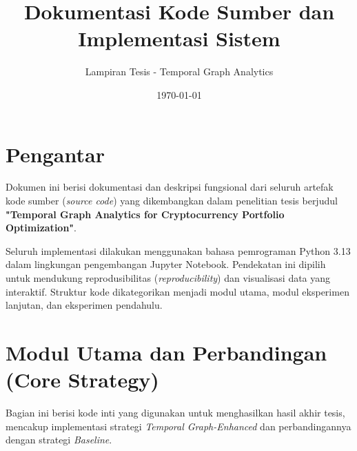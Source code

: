 \documentclass[a4paper,12pt]{article}
\title{\textbf{Dokumentasi Kode Sumber dan Implementasi Sistem}}
\author{Lampiran Tesis - Temporal Graph Analytics}
\date{\today}
\begin{document}
\maketitle

\section*{Pengantar}
\label{sec:pengantar}

Dokumen ini berisi dokumentasi dan deskripsi fungsional dari seluruh artefak kode sumber (\textit{source code}) yang dikembangkan dalam penelitian tesis berjudul \textbf{"Temporal Graph Analytics for Cryptocurrency Portfolio Optimization"}.

Seluruh implementasi dilakukan menggunakan bahasa pemrograman Python 3.13 dalam lingkungan pengembangan Jupyter Notebook. Pendekatan ini dipilih untuk mendukung reprodusibilitas (\textit{reproducibility}) dan visualisasi data yang interaktif. Struktur kode dikategorikan menjadi modul utama, modul eksperimen lanjutan, dan eksperimen pendahulu.

\section{Modul Utama dan Perbandingan (Core Strategy)}
Bagian ini berisi kode inti yang digunakan untuk menghasilkan hasil akhir tesis, mencakup implementasi strategi \textit{Temporal Graph-Enhanced} dan perbandingannya dengan strategi \textit{Baseline}.
\end{document}
